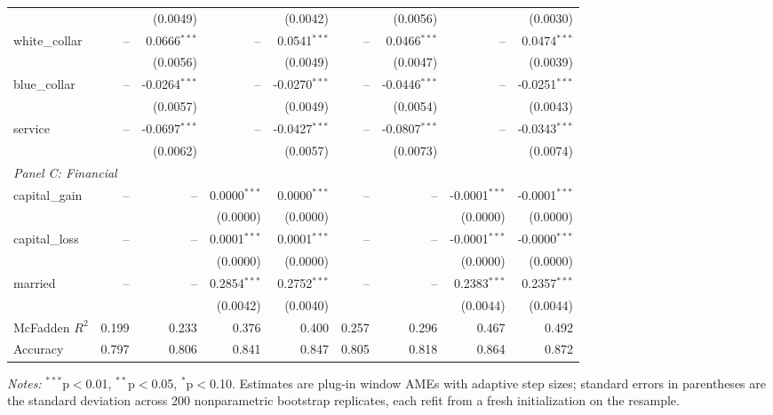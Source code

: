 \documentclass[conference]{IEEEtran}
\begin{document}
\begin{table}[htbp]
{\begin{threeparttable}
\begin{tabular}{lrrrrrrrr}
					&  & (0.0049) &  & (0.0042) &  & (0.0056) &  & (0.0030) \\
					\quad white\_collar & -- & 0.0666$^{***}$ & -- & 0.0541$^{***}$ & -- & 0.0466$^{***}$ & -- & 0.0474$^{***}$ \\
					&  & (0.0056) &  & (0.0049) &  & (0.0047) &  & (0.0039) \\
					\quad blue\_collar & -- & -0.0264$^{***}$ & -- & -0.0270$^{***}$ & -- & -0.0446$^{***}$ & -- & -0.0251$^{***}$ \\
					&  & (0.0057) &  & (0.0049) &  & (0.0054) &  & (0.0043) \\
					\quad service & -- & -0.0697$^{***}$ & -- & -0.0427$^{***}$ & -- & -0.0807$^{***}$ & -- & -0.0343$^{***}$ \\
					&  & (0.0062) &  & (0.0057) &  & (0.0073) &  & (0.0074) \\
					\midrule
					\multicolumn{9}{l}{\textit{Panel C: Financial}} \\
					\quad capital\_gain & -- & -- & 0.0000$^{***}$ & 0.0000$^{***}$ & -- & -- & -0.0001$^{***}$ & -0.0001$^{***}$ \\
					&  &  & (0.0000) & (0.0000) &  &  & (0.0000) & (0.0000) \\
					\quad capital\_loss & -- & -- & 0.0001$^{***}$ & 0.0001$^{***}$ & -- & -- & -0.0001$^{***}$ & -0.0000$^{***}$ \\
					&  &  & (0.0000) & (0.0000) &  &  & (0.0000) & (0.0000) \\
					\quad married & -- & -- & 0.2854$^{***}$ & 0.2752$^{***}$ & -- & -- & 0.2383$^{***}$ & 0.2357$^{***}$ \\
					&  &  & (0.0042) & (0.0040) &  &  & (0.0044) & (0.0044) \\
					\midrule
					McFadden $R^2$ & 0.199 & 0.233 & 0.376 & 0.400 & 0.257 & 0.296 & 0.467 & 0.492 \\
					Accuracy & 0.797 & 0.806 & 0.841 & 0.847 & 0.805 & 0.818 & 0.864 & 0.872 \\
					\bottomrule
					\end{tabular}
					\begin{tablenotes}
					\footnotesize
					\item \textit{Notes:} $^{***}$p$<$0.01, $^{**}$p$<$0.05, $^{*}$p$<$0.10. Estimates are plug-in window AMEs with adaptive step sizes; standard errors in parentheses are the standard deviation across 200 nonparametric bootstrap replicates, each refit from a fresh initialization on the resample.
					\end{tablenotes}
			\end{threeparttable}
		}%
	\end{table}
	
\end{document}
